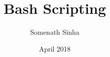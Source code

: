 

\title{Bash Scripting}
\author{Somenath Sinha}
\date{April 2018}


	\maketitle
	\newpage
	\tableofcontents
	
	
		
	
